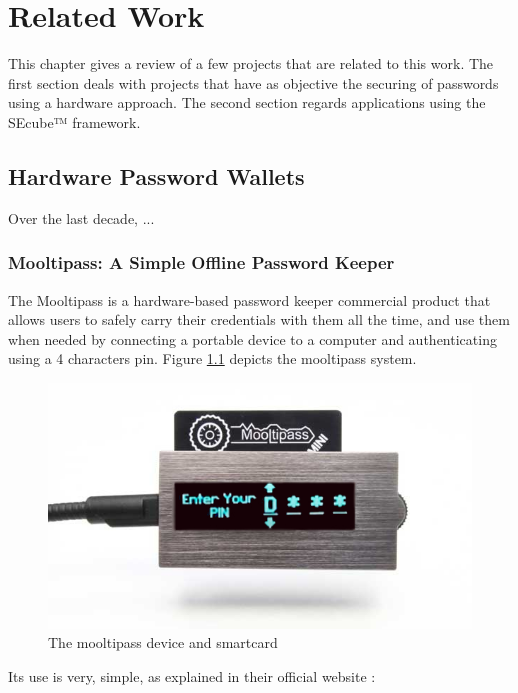 \chapter{Related Work} \label{chap:related}

This chapter gives a review of a few projects that are related to this work. The first section deals with projects that have as objective the securing of passwords using a hardware approach. The second section regards applications using the SEcube™ framework.

\section {Hardware Password Wallets}
Over the last decade, ... 

\subsection {Mooltipass: A Simple Offline Password Keeper} 

The Mooltipass is a hardware-based password keeper commercial product that allows users to safely carry their credentials with them all the time, and use them when needed by connecting a portable device to a computer and authenticating using a 4 characters pin. 
Figure \ref{fig:mool} depicts the mooltipass system.

\begin{figure}[htb]
  \centering
  \captionsetup{justification=centering}
  \centerline{\includegraphics[width=0.6\columnwidth]{chapters/figures/related/mooltipass.jpg}}
  \caption{The mooltipass device and smartcard}
  \label{fig:mool}
\end{figure}

Its use is very, simple, as explained in their official website \cite{mooltipass}:

